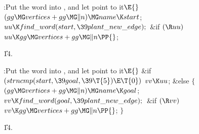 \Y\B\4:Put the  word into , and let 
point to it\X${}\E{}$\6
$(\\{gg}\MG\\{vertices}+\\{gg}\MG\|n)\MG\\{name}\K\\{start}{}$;\6
${}\\{uu}\K\\{find\_word}(\\{start},\39\\{plant\_new\_edge});{}$\6
\&{if} ${}(\R\\{uu}){}$\1\5
${}\\{uu}\K\\{gg}\MG\\{vertices}+\\{gg}\MG\|n\PP{}$;\2\par
\U14.\fi

\B{}:Put the  word into , and let 
point to it\X${}\E{}$\6
\&{if} ${}(\\{strncmp}(\\{start},\39\\{goal},\39\T{5})\E\T{0}){}$\1\5
${}\\{vv}\K\\{uu}{}$;\2\6
\&{else}\5
${}\{{}$\1\6
${}(\\{gg}\MG\\{vertices}+\\{gg}\MG\|n)\MG\\{name}\K\\{goal}{}$;\6
${}\\{vv}\K\\{find\_word}(\\{goal},\39\\{plant\_new\_edge});{}$\6
\&{if} ${}(\R\\{vv}){}$\1\5
${}\\{vv}\K\\{gg}\MG\\{vertices}+\\{gg}\MG\|n\PP{}$;\2\6
\4${}\}{}$\2\par
\U14.\fi

